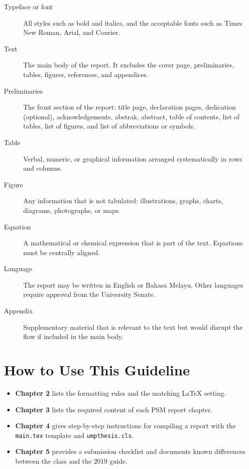 \begin{description}
    \item[Typeface or font] All styles such as bold and italics, and the acceptable fonts such as Times New Roman, Arial, and Courier.
    \item[Text] The main body of the report. It excludes the cover page, preliminaries, tables, figures, references, and appendices.
    \item[Preliminaries] The front section of the report: title page, declaration pages, dedication (optional), acknowledgements, abstrak, abstract, table of contents, list of tables, list of figures, and list of abbreviations or symbols.
    \item[Table] Verbal, numeric, or graphical information arranged systematically in rows and columns.
    \item[Figure] Any information that is not tabulated: illustrations, graphs, charts, diagrams, photographs, or maps.
    \item[Equation] A mathematical or chemical expression that is part of the text. Equations must be centrally aligned.
    \item[Language] The report may be written in English or Bahasa Melayu. Other languages require approval from the University Senate.
    \item[Appendix] Supplementary material that is relevant to the text but would disrupt the flow if included in the main body.
\end{description}

\section{How to Use This Guideline}

\begin{itemize}
    \item \textbf{Chapter 2} lists the formatting rules and the matching \LaTeX{} setting.
    \item \textbf{Chapter 3} lists the required content of each PSM report chapter.
    \item \textbf{Chapter 4} gives step-by-step instructions for compiling a report with the \texttt{main.tex} template and \texttt{umpthesis.cls}.
    \item \textbf{Chapter 5} provides a submission checklist and documents known differences between the class and the 2019 guide.
\end{itemize}
